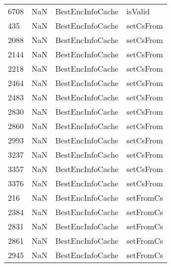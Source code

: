 \begin{tabular}{llll}
6708 &                   NaN &           BestEncInfoCache &                                   isValid \\
435  &                   NaN &           BestEncInfoCache &                                 setCsFrom \\
2088 &                   NaN &           BestEncInfoCache &                                 setCsFrom \\
2144 &                   NaN &           BestEncInfoCache &                                 setCsFrom \\
2218 &                   NaN &           BestEncInfoCache &                                 setCsFrom \\
2464 &                   NaN &           BestEncInfoCache &                                 setCsFrom \\
2483 &                   NaN &           BestEncInfoCache &                                 setCsFrom \\
2830 &                   NaN &           BestEncInfoCache &                                 setCsFrom \\
2860 &                   NaN &           BestEncInfoCache &                                 setCsFrom \\
2993 &                   NaN &           BestEncInfoCache &                                 setCsFrom \\
3237 &                   NaN &           BestEncInfoCache &                                 setCsFrom \\
3357 &                   NaN &           BestEncInfoCache &                                 setCsFrom \\
3376 &                   NaN &           BestEncInfoCache &                                 setCsFrom \\
216  &                   NaN &           BestEncInfoCache &                                 setFromCs \\
2384 &                   NaN &           BestEncInfoCache &                                 setFromCs \\
2831 &                   NaN &           BestEncInfoCache &                                 setFromCs \\
2861 &                   NaN &           BestEncInfoCache &                                 setFromCs \\
2945 &                   NaN &           BestEncInfoCache &                                 setFromCs \\

\end{tabular}
